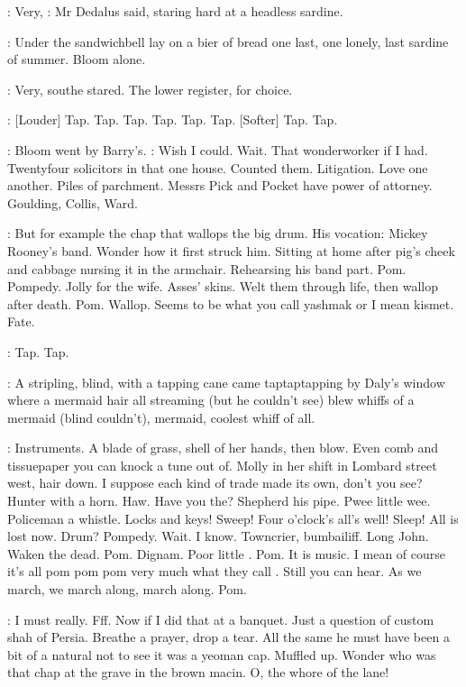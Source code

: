 \Simon:
Very,
:
Mr Dedalus said, staring hard at a headless sardine.

:
Under the sandwichbell
lay on a bier of bread one last, one lonely, last
sardine of summer. Bloom alone.

\Simon:
Very,
sout{he stared.}
The lower register, for choice.

\Stripling:
[Louder] Tap. Tap. Tap. Tap. Tap. Tap.
[Softer] Tap. Tap.

:
Bloom went by Barry's.
\BloomInt:
Wish I could. Wait. That wonderworker if I
had. Twentyfour solicitors in that one house. Counted them. Litigation.
Love one another. Piles of parchment. Messrs Pick and Pocket have power
of attorney. Goulding, Collis, Ward.

\BloomInt:
But for example the chap that wallops the big drum. His vocation:
Mickey Rooney's band. Wonder how it first struck him. Sitting at home
after pig's cheek and cabbage nursing it in the armchair.
Rehearsing his
band part. Pom. Pompedy. Jolly for the wife. Asses' skins. Welt them
through life, then wallop after death. Pom. Wallop. Seems to be what you
call yashmak or I mean kismet. Fate.

\Stripling:
Tap. Tap.

:
A stripling, blind, with a tapping cane came taptaptapping
by Daly's window where a mermaid hair all streaming (but he couldn't see)
blew whiffs of a mermaid (blind couldn't), mermaid, coolest whiff of all.

\BloomInt:
Instruments. A blade of grass, shell of her hands, then blow. Even
comb and tissuepaper you can knock a tune out of. Molly in her shift in
Lombard street west, hair down. I suppose each kind of trade made its own,
don't you see?
Hunter with a horn. Haw. Have you the?
Shepherd his pipe. Pwee little wee. Policeman a whistle. Locks and keys!
Sweep! Four o'clock's all's well! Sleep! All is lost now. Drum? Pompedy.
Wait. I know. Towncrier, bumbailiff. Long John. Waken the dead. Pom.
Dignam. Poor little .
Pom. It is music. I mean of course it's
all pom pom pom very much what they call
. Still you can hear. As
we march, we march along, march along. Pom.

\BloomInt:
I must really. Fff. Now if I did that at a banquet. Just a question of
custom shah of Persia. Breathe a prayer, drop a tear. All the same he must
have been a bit of a natural not to see it was a yeoman cap. Muffled up.
Wonder who was that chap at the grave in the brown macin.
O, the whore of the lane!

